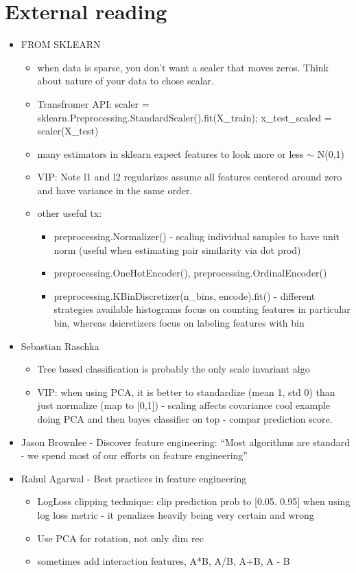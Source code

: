 \documentclass[a4paper]{report}
\newcommand{\brown}{\color{brown}}
\begin{document}
\section{External reading}
\begin{itemize}
  \item FROM SKLEARN
    \begin{itemize}
      \item when data is sparse, you don't want a scaler that moves zeros. Think about nature of your data to chose scalar.
      \item Transfromer API: {\brown scaler = sklearn.Preprocessing.StandardScaler().fit(X\_train); x\_test\_scaled = scaler(X\_test)}
      \item many estimators in sklearn expect features to look more or less $\sim$ N(0,1)
      \item VIP: Note l1 and l2 regularizes assume all features centered around zero and have variance in the same order.
      \item other useful tx:
	\begin{itemize}
	  \item preprocessing.Normalizer() - scaling individual samples to have unit norm (useful when estimating pair similarity via dot prod)
	  \item preprocessing.OneHotEncoder(), preprocessing.OrdinalEncoder()
	  \item preprocessing.KBinDiscretizer(n\_bins, encode).fit() - different strategies available
	    \subitem histograms focus on counting features in particular bin, whereas dsicretizers focus on labeling features with bin
	\end{itemize}
    \end{itemize}
  \item Sebastian Raschka
    \begin{itemize}
      \item Tree based classification is probably the only scale invariant algo
      \item VIP: when using PCA, it is better to standardize (mean 1, std 0) than just normalize (map to [0,1]) - scaling affects covariance
	\subitem cool example doing PCA and then bayes classifier on top - compar prediction score.
    \end{itemize}
  \item Jason Brownlee - Discover feature engineering: ``Most algorithms are standard - we spend most of our efforts on feature engineering''
  \item Rahul Agarwal - Best practices in feature engineering
    \begin{itemize}
      \item LogLoss clipping technique: clip prediction prob to [0.05. 0.95]  when using log loss metric - it penalizes heavily being very certain and wrong
      \item Use PCA for rotation, not only dim rec
      \item sometimes add interaction features, A*B, A/B, A+B, A - B
    \end{itemize}
\end{itemize}
\end{document}
